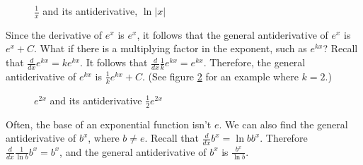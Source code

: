 \begin{figure}[htpb]
\centering
 \caption{$\frac{1}{x}$ and its antiderivative, $\ln{|x|}$}
 \label{fig:naturallog}
\end{figure}

Since the derivative of $e^{x}$ is $e^{x}$, it follows that the general 
antiderivative of $e^{x}$ is $e^{x} + C$. What if there is a 
multiplying factor in the exponent, such as $e^{kx}$? Recall that 
$\frac{d}{dx} e^{kx} = k e^{kx}$. It follows that $\frac{d}{dx} 
\frac{1}{k} e^{kx} = e^{kx}$. Therefore, the general antiderivative of 
$e^{kx}$ is $\frac{1}{k} e^{kx} + C$. (See figure \ref{fig:antiexp} 
for an example where $k = 2$.)

\begin{figure}[htbp]
\centering
	\caption{$e^{2x}$ and its antiderivative $\frac{1}{2}e^{2x}$}
	\label{fig:antiexp}
\end{figure}

Often, the base of an exponential function isn't $e$. We can also find 
the general antiderivative of $b^{x}$, where $b \neq e$. Recall that 
$\frac{d}{dx} b^x = \ln{b} b^x$. Therefore $\frac{d}{dx} \frac{1}{\ln{b}} 
b^x = b^x$, and the general antiderivative of $b^x$ is $\frac{b^x}{\ln{b}}$. 

